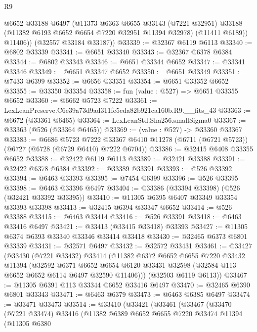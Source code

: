 \begin{lexlean}{R9}
\begin{coremodule}
          @6652
          @33188
          @6497
          (@11373
            @6363
            @6655
            @33143
            (@7221 @32951)
            @33188
            (@11382 @6193 @6652 @6654 @7220 @32951 @11394 @32978)
            (@11411 @6189))
          @11406))
      (@32557 @33184 @33187))
@33339 := @32367 @6119 @6113
@33340 := @6802 @33339
@33341 := @6651 @33340
@33343 := @32367 @6378 @6384
@33344 := @6802 @33343
@33346 := @6651 @33344 @6652
@33347 := @33341 @33346
@33349 := @6651 @33347 @6652
@33350 := @6651 @33349
@33351 := @7433 @6399
@33352 := @6656 @33351
@33354 := @6651 @33352 @6652
@33355 := @33350 @33354
@33358 := fun (value : @527) => @6651 @33355 @6652
@33360 := @6662 @5723 @7222
@33361 := LexLeanPreserve.C6e39a73d9ad311fe5eda82b921ca160b.R9.__fits_43
@33363 := @6672 (@33361 @6465)
@33364 := LexLeanStd.Sha256.smallSigma0
@33367 := @33363 (@526 (@33364 @6465))
@33369 := (value : @527) -> @33360 @33367
@33383 := @6686
    @5723
    @7222
    @33367
    @6410
    @11278
    (@6711 (@6721 @5723))
    (@6727 (@6728 (@6729 @6410) @7222 @6704))
@33386 := @32415 @6408 @33355 @6652
@33388 := @32422 @6119 @6113
@33389 := @32421 @33388
@33391 := @32422 @6378 @6384
@33392 := @33389 @33391
@33393 := @526 @33392
@33394 := @6463 @33393
@33395 := @7454 @6399
@33396 := @526 @33395
@33398 := @6463 @33396 @6497
@33404 := @33386 (@33394 @33398) (@526 (@32421 @33392 @33395))
@33410 := @11305 @6395 @6407 @33349 @33354 @33393 @33398
@33413 := @32415 @6394 @33347 @6652
@33414 := @526 @33388
@33415 := @6463 @33414
@33416 := @526 @33391
@33418 := @6463 @33416 @6497
@33421 := @33413 (@33415 @33418) @33393
@33427 := @11305 @6374 @6393 @33340 @33346 @33414 @33418
@33430 := @32465 @6373 @6801 @33339
@33431 := @32571 @6497
@33432 := @32572 @33431
@33461 := @33427
    (@33430
      (@7221 @33432)
      @33414
      (@11382
        @6372
        @6652
        @6655
        @7220
        @33432
        @11394
        (@32592
          @6371
          @6652
          @6654
          @6120
          @33431
          @32598
          (@32584 @113 @6652 @6652 @6114 @6497 @32590 @11406)))
      (@32503 @6119 @6113))
@33467 := @11305 @6391 @113 @33344 @6652 @33416 @6497
@33470 := @32465 @6390 @6801 @33343
@33471 := @6463 @6379
@33473 := @6463 @6385 @6497
@33474 := @33471 @33473
@33514 := @33410
    (@33421
      (@33461
        (@33467
          (@33470
            (@7221 @33474)
            @33416
            (@11382
              @6389
              @6652
              @6655
              @7220
              @33474
              @11394
              (@11305
                @6380

\end{coremodule}
\end{lexlean}
